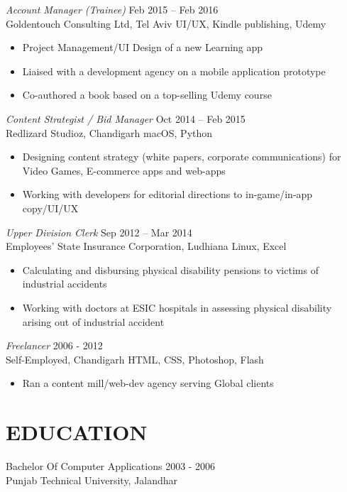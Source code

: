 \documentclass[margin, 10pt]{res} %
\begin{document}
\begin{resume}
{\sl Account Manager (Trainee)} \hfill Feb 2015 – Feb 2016 \\
Goldentouch Consulting Ltd, Tel Aviv \hfill {\scriptsize UI/UX, Kindle publishing, Udemy} 
\begin{itemize}
\item Project Management/UI Design of a new Learning app
\item Liaised with a development agency on a mobile application prototype
\item Co-authored a book based on a top-selling Udemy course
\end{itemize}

{\sl Content Strategist / Bid Manager} \hfill Oct 2014 – Feb 2015 \\
Redlizard Studioz, Chandigarh \hfill {\scriptsize macOS, Python}
\begin{itemize}
\item Designing content strategy (white papers, corporate communications) for Video Games, E-commerce apps and web-apps
\item Working with developers for editorial directions to in-game/in-app copy/UI/UX
\end{itemize}

{\sl Upper Division Clerk} \hfill Sep 2012 – Mar 2014 \\
Employees' State Insurance Corporation, Ludhiana \hfill {\scriptsize Linux, Excel}
\begin{itemize}
\item Calculating and disbursing physical disability pensions to victims of industrial accidents
\item Working with doctors at ESIC hospitals in assessing physical disability arising out of industrial accident 
\end{itemize} 

{\sl Freelancer} \hfill 2006 - 2012 \\
Self-Employed, Chandigarh \hfill {\scriptsize HTML, CSS, Photoshop, Flash} 
\begin{itemize}
\item Ran a content mill/web-dev agency serving Global clients
\end{itemize}

\section{EDUCATION}
Bachelor Of Computer Applications \hfill 2003 - 2006 \\
Punjab Technical University, Jalandhar 

\end{resume}
\end{document}
